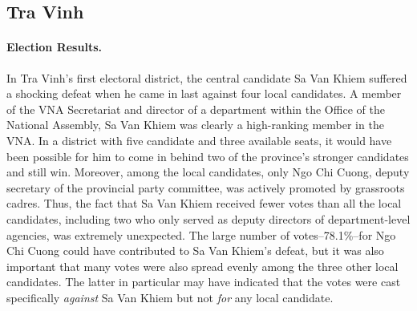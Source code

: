 \documentclass[12pt]{article}
\newcommand{\1}{\mathbbm{1}}
\begin{document}
\subsection{Tra Vinh}

\paragraph{Election Results.} 

In Tra Vinh's first electoral district, the central candidate Sa Van Khiem suffered a shocking defeat when he came in last against four local candidates. A member of the VNA Secretariat and director of a department within the Office of the National Assembly, Sa Van Khiem was clearly a high-ranking member in the VNA. In a district with five candidate and three available seats, it would have been possible for him to come in behind two of the province's stronger candidates and still win. Moreover, among the local candidates, only Ngo Chi Cuong, deputy secretary of the provincial party committee, was actively promoted by grassroots cadres. Thus, the fact that Sa Van Khiem received fewer votes than all the local candidates, including two who only served as deputy directors of department-level agencies, was extremely unexpected. The large number of votes--78.1\%--for Ngo Chi Cuong could have contributed to Sa Van Khiem's defeat, but it was also important that many votes were also spread evenly among the three other local candidates. The latter in particular may have indicated that the votes were cast specifically \textit{against} Sa Van Khiem but not \textit{for} any local candidate.
\end{document}
